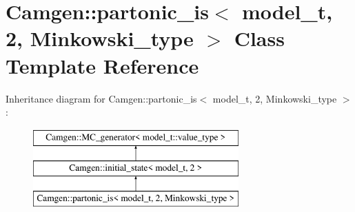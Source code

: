 \hypertarget{a00408}{\section{Camgen\-:\-:partonic\-\_\-is$<$ model\-\_\-t, 2, Minkowski\-\_\-type $>$ Class Template Reference}
\label{a00408}
}
Inheritance diagram for Camgen\-:\-:partonic\-\_\-is$<$ model\-\_\-t, 2, Minkowski\-\_\-type $>$\-:\begin{figure}[H]
\begin{center}
\leavevmode
\includegraphics[height=3.000000cm]{a00408}
\end{center}
\end{figure}
